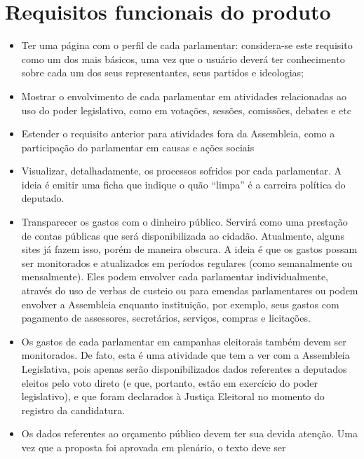 \documentclass[12pt, a4paper]{article}
\begin{document}
    \section{Requisitos funcionais do produto}
    \begin{itemize}
        \item
        Ter uma página com o perfil de cada parlamentar: considera-se este
        requisito como um dos mais básicos, uma vez que o usuário deverá ter
        conhecimento sobre cada um dos seus representantes, seus partidos e
        ideologias;
        \item
        Mostrar o envolvimento de cada parlamentar em atividades relacionadas
        ao uso do poder legislativo, como em votações, sessões, comissões,
        debates e etc
        \item
        Estender o requisito anterior para atividades fora da Assembleia, como
        a participação do parlamentar em causas e ações sociais
        \item
        Visualizar, detalhadamente, os processos sofridos por cada parlamentar.
        A ideia é emitir uma ficha que indique o quão “limpa” é a carreira
        política do deputado.
        \item
        Transparecer os gastos com o dinheiro público. Servirá como uma
        prestação de contas públicas que será disponibilizada ao cidadão.
        Atualmente, alguns sites já fazem isso, porém de maneira obscura. A
        ideia é que os gastos possam ser monitorados e atualizados em períodos
        regulares (como semanalmente ou mensalmente). Eles podem envolver cada
        parlamentar individualmente, através do uso de verbas de custeio ou
        para emendas parlamentares ou podem envolver a Assembleia enquanto
        instituição, por exemplo, seus gastos com pagamento de assessores,
        secretários, serviços, compras e licitações.
        \item
        Os gastos de cada parlamentar em campanhas eleitorais também devem ser
        monitorados. De fato, esta é uma atividade que tem a ver com a
        Assembleia Legislativa, pois apenas serão disponibilizados dados
        referentes a deputados eleitos pelo voto direto (e que, portanto, estão
        em exercício do poder legislativo), e que foram declarados à Justiça
        Eleitoral no momento do registro da candidatura.
        \item
        Os dados referentes ao orçamento público devem ter sua devida atenção.
        Uma vez que a proposta foi aprovada em plenário, o texto deve ser

\end{itemize}
\end{document}
